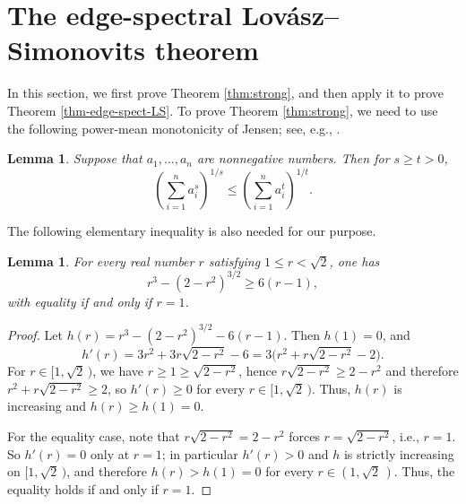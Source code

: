 \documentclass[11pt,a4paper]{article}
\newtheorem{lemma}[theorem]{Lemma}
\theoremstyle{definition}
\theoremstyle{plain}
\renewcommand{\leq}{\leqslant}
\renewcommand{\le}{\leqslant}
\renewcommand{\geq}{\geqslant}
\renewcommand{\ge}{\geqslant}
\begin{document}
\section{The edge-spectral Lov\'{a}sz--Simonovits theorem}

\label{sec:3}


In this section, we first prove Theorem \ref{thm:strong}, and then apply it to prove Theorem \ref{thm-edge-spect-LS}.  
To prove Theorem \ref{thm:strong}, we need to use the following power-mean monotonicity of Jensen; see, e.g., \cite{Beck1946}. 

\begin{lemma} \label{lem:Jensen}
Suppose that $a_1,\ldots ,a_n$ are nonnegative numbers. Then for $s\ge t>0$,  
\[ \left(\sum_{i=1}^n a_i^s \right)^{\!1/s} \le 
\left(\sum_{i=1}^n a_i^t \right)^{\!1/t} .  \] 
\end{lemma}

The following elementary inequality is also needed for our purpose. 



\begin{lemma}\label{lem:scalar}
For every real number $r$ satisfying
$ 1\leq r< \sqrt 2$, 
one has
\[
    r^3-(2-r^2)^{3/2}\geq 6(r-1),
\]
with equality if and only if $r=1$. 
\end{lemma}

\begin{proof}
Let $h(r)=r^3-(2-r^2)^{3/2}-6(r-1)$. Then $h(1)=0$, and
\[
    h'(r)=3r^2+3r\sqrt{2-r^2}-6=3\bigl(r^2+r\sqrt{2-r^2}-2\bigr).
\]
For $r\in[1,\sqrt2 \, )$, we have $r\ge1 \ge\sqrt{2-r^2}$, hence
$r\sqrt{2-r^2}\ge 2-r^2$ and therefore $r^2+r\sqrt{2-r^2}\ge 2$, so
$h'(r)\ge 0$ for every $r\in [1,\sqrt2 \, )$. Thus, $h(r)$ is increasing and $h(r)\ge h(1)=0$.

For the equality case, note that $r\sqrt{2-r^2}= 2-r^2$ forces $r=\sqrt{2-r^2}$, i.e., $r=1$. So $h'(r)=0$ only at
$r=1$; in particular $h'(r)>0$ and $h$ is
strictly increasing on $[1,\sqrt2\,)$, and therefore $h(r)>h(1)=0$ for every
$r\in(1,\sqrt2\,)$. Thus, the equality holds if and only if $r=1$. 
\end{proof}
\end{document}
